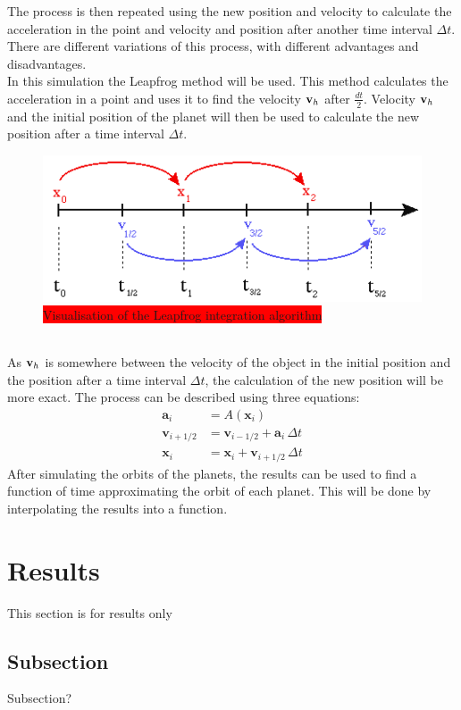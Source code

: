 \documentclass[reprint,english,notitlepage]{revtex4-2}
\begin{document}
The process is then repeated using the new position and velocity to calculate the acceleration in the point and velocity and position after another time interval $\Delta t$.
There are different variations of this process, with different advantages and disadvantages.\\
In this simulation the Leapfrog method will be used.
This method calculates the acceleration in a point and uses it to find the velocity $\bold{v}_h$ after $ \frac{dt}{2}$.
Velocity $\bold{v}_h$ and the initial position of the planet will then be used to calculate the new position after a time interval $\Delta t$.\\
\begin{figure}[h]
	\centering
	\includegraphics[scale=0.4]{Figures/leapfrog1}
	\caption{\colorbox{red}{Visualisation of the Leapfrog integration algorithm}}\label{fig:Leapfrog_vis}
\end{figure}\\
As $\bold{v}_h$ is somewhere between the velocity of the object in the initial position and the position after a time interval $\Delta t$, the calculation of the new position will be more exact.
The process can be described using three equations:
\begin{align*}
    \textbf{a}_i &= A(\textbf{x}_i)\\
	\textbf{v}_{i+1/2} &= \textbf{v}_{i-1/2} + \textbf{a}_i\,\Delta t\\
	\textbf{x}_{i} &= \textbf{x}_i + \textbf{v}_{i+1/2}\,\Delta t
\end{align*}
After simulating the orbits of the planets, the results can be used to find a function of time approximating the orbit of each planet.
This will be done by interpolating the results into a function.


\section{Results}
This section is for results only
	\subsection{Subsection}
    Subsection?
\end{document}
